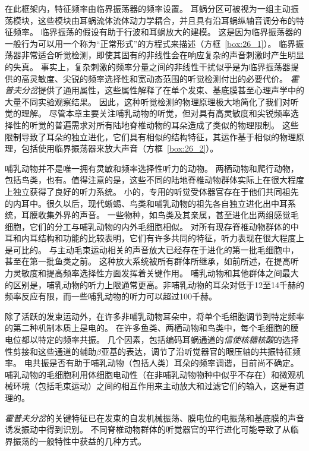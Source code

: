 在此框架内，特征频率由临界振荡器的频率设置。
耳蜗分区可被视为一组主动振荡模块，这些模块由耳蜗流体流体动力学耦合，并且具有沿耳蜗纵轴音调分布的特征频率。
临界振荡的假设有助于行波和耳蜗放大的建模。
这是因为临界振荡器的一般行为可以用一个称为“正常形式”的方程式来描述（方框~\ref{box:26_1}）。
临界振荡器非常适合听觉检测，即使其固有的非线性会在响应复杂的声音刺激时产生明显的失真。
事实上，复杂刺激的频率分量之间的非线性干扰似乎是为临界振荡器提供的高灵敏度、尖锐的频率选择性和宽动态范围的听觉检测付出的必要代价。
\textit{霍普夫分岔}提供了通用属性，这些属性解释了在单个发束、基底膜甚至心理声学中的大量不同实验观察结果。
因此，这种听觉检测的物理原理极大地简化了我们对听觉的理解。
尽管本章主要关注哺乳动物的听觉，但对具有高灵敏度和尖锐频率选择性的听觉的普遍需求对所有陆地脊椎动物的耳朵造成了类似的物理限制。
这些限制导致了耳朵的独立进化，它们具有相似的结构特征，其运作基于相似的物理原理，包括使用临界振荡器来放大声音（方框~\ref{box:26_2}）。


\begin{proposition}[听觉的进化史导致了群体之间的相似性] \label{box:26_2}
	
	\quad \quad 哺乳动物并不是唯一拥有灵敏和频率选择性听力的动物。
	两栖动物和爬行动物，包括鸟类，也有。值得注意的是，这些不同的陆地脊椎动物群体实际上在很大程度上独立获得了良好的听力系统。
	小的，专用的听觉受体器官存在于他们共同祖先的内耳中。很久以后，现代蜥蜴、鸟类和哺乳动物的祖先各自独立进化出中耳系统，耳膜收集外界的声音。
	一些物种，如鸟类及其亲属，甚至进化出两组感觉毛细胞，它们的分工与哺乳动物的内外毛细胞相似。
	对所有现存脊椎动物群体的中耳和内耳结构和功能的比较表明，它们有许多共同的特征，听力表现在很大程度上是可比的。
	与主动毛束运动相关的声音放大已经存在于进化的第一批毛细胞中，甚至在第一批鱼类之前。
	这种放大系统被所有群体所继承，如前所述，在提高听力灵敏度和提高频率选择性方面发挥着关键作用。
	哺乳动物和其他群体之间最大的区别是，哺乳动物的听力上限通常更高。非哺乳动物的耳朵对低于12至14千赫的频率反应有限，而一些哺乳动物的听力可以超过100千赫。
	
	\quad \quad 除了活跃的发束运动外，在许多非哺乳动物耳朵中，将单个毛细胞调节到特定频率的第二种机制本质上是电的。
	在许多鱼类、两栖动物和鸟类中，每个毛细胞的膜电位都以特定的频率共振。
	几个因素，包括编码耳蜗通道的\textit{信使核糖核酸}的选择性剪接和这些通道的辅助$\beta$亚基的表达，调节了沿听觉器官的眼压轴的共振特征频率。
	电共振是否有助于哺乳动物（包括人类）耳朵的频率调谐，目前尚不确定。
	哺乳动物的毛细胞利用体细胞电动性（在非哺乳动物物种中似乎不存在）和微观机械环境（包括毛束运动）之间的相互作用来主动放大和过滤它们的输入，这是有道理的。
	
	\quad \quad \textit{霍普夫分岔}的关键特征已在发束的自发机械振荡、膜电位的电振荡和基底膜的声音诱发振动中得到识别。
	不同脊椎动物群体的听觉器官的平行进化可能导致了从临界振荡的一般特性中获益的几种方式。
	
\end{proposition}



